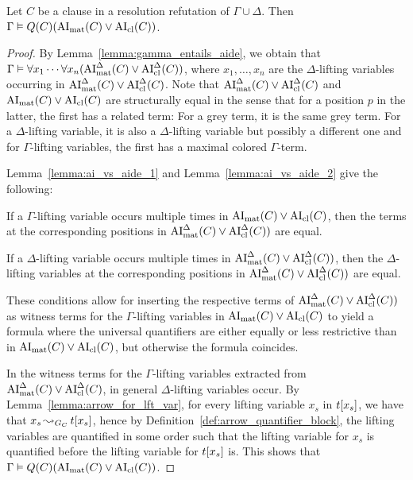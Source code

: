 \documentclass[,%
	draft=false,%
	numbers=noendperiod
	11pt,
	a4paper,
	oneside,%
	openany,
]{memoir}
\begin{document}
\begin{lemma}
	\label{lemma:gamma_entails_quantified_ai}
	Let $C$ be a clause in a resolution refutation of $\Gamma\cup\Delta$.
	Then
	$\Gamma \entails\nolinebreak Q(C) ( \AImat(C) \lor\nolinebreak \AIcl(C))$.
\end{lemma}
\begin{proof}
	By Lemma~\ref{lemma:gamma_entails_aide}, we obtain that 
	$\Gamma \vDash \forall x_1 \cdots \forall x_n (\operatorname{AI}_\mathrm{mat}^\Delta(C) \lor \operatorname{AI}_\mathrm{cl}^\Delta(C))$, where $x_1,\dots,x_n$ are the $\Delta$-lifting variables occurring in $\operatorname{AI}_\mathrm{mat}^\Delta(C) \lor \operatorname{AI}_\mathrm{cl}^\Delta(C)$.
	Note that $\operatorname{AI}_\mathrm{mat}^\Delta(C) \lor \operatorname{AI}_\mathrm{cl}^\Delta(C)$ and $\AImat(C) \lor\nolinebreak \AIcl(C)$ are structurally equal in the sense that for a position $p$ in the latter, the first has a related term: For a grey term, it is the same grey term. For a $\Delta$-lifting variable, it is also a $\Delta$-lifting variable but possibly a different one and for $\Gamma$-lifting variables, the first has a maximal colored $\Gamma$-term.

	Lemma~\ref{lemma:ai_vs_aide_1} and
	Lemma~\ref{lemma:ai_vs_aide_2} give the following:
	\begin{compactenum}
	\item If a $\Gamma$-lifting variable occurs multiple times in $\operatorname{AI}_\mathrm{mat}(C)\lor\operatorname{AI}_\mathrm{cl}(C)$, then the terms at the corresponding positions in $\operatorname{AI}_\mathrm{mat}^\Delta(C) \lor \operatorname{AI}_\mathrm{cl}^\Delta(C))$ are equal.
	\item If a $\Delta$-lifting variable occurs multiple times in $\operatorname{AI}_\mathrm{mat}^\Delta(C) \lor \operatorname{AI}_\mathrm{cl}^\Delta(C))$, then the $\Delta$-lifting variables at the corresponding positions in $\operatorname{AI}_\mathrm{mat}^\Delta(C) \lor \operatorname{AI}_\mathrm{cl}^\Delta(C))$ are equal.
	\end{compactenum}
	These conditions allow for inserting the respective terms of $\operatorname{AI}_\mathrm{mat}^\Delta(C) \lor \operatorname{AI}_\mathrm{cl}^\Delta(C))$ as witness terms for the $\Gamma$-lifting variables in $\operatorname{AI}_\mathrm{mat}(C)\lor\operatorname{AI}_\mathrm{cl}(C)$ to yield a formula where the universal quantifiers are either equally or less restrictive than in $\operatorname{AI}_\mathrm{mat}(C)\lor\operatorname{AI}_\mathrm{cl}(C)$, but otherwise the formula coincides.

	In the witness terms for the $\Gamma$-lifting variables extracted from $\operatorname{AI}_\mathrm{mat}^\Delta(C) \lor \operatorname{AI}_\mathrm{cl}^\Delta(C)$, in general $\Delta$-lifting variables occur. 
	By Lemma~\ref{lemma:arrow_for_lft_var}, for every lifting variable $x_s$ in $t[x_s]$, we have that $x_s \operatorname{\leadsto}_{G_C} t[x_s]$, hence by Definition~\ref{def:arrow_quantifier_block}, the lifting variables are quantified in some order such that the lifting variable for $x_s$ is quantified before the lifting variable for $t[x_s]$ is.
	This shows that $\Gamma \entails\nolinebreak Q(C) ( \AImat(C) \lor\nolinebreak \AIcl(C))$.
\end{proof}
\end{document}
